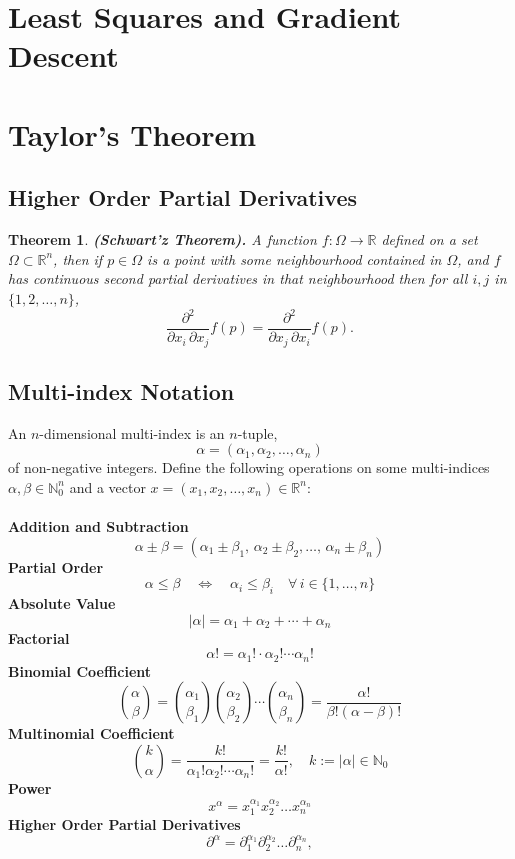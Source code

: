 \documentclass[11pt,a4paper]{article}
\theoremstyle{definition}
\theoremstyle{plain}
\newtheorem{theorem}{Theorem}[section]
\newcommand{\N}{\mathbb{N}}
\newcommand{\R}{\mathbb{R}}
\begin{document}
	\newpage
	
	\section{Least Squares and Gradient Descent}
	
	\newpage
	
	\section{Taylor's Theorem}
	\subsection{Higher Order Partial Derivatives}
	\begin{theorem}
		\textnormal{\textbf{(Schwart'z Theorem).}}
		A function $f \colon \Omega \to \R$ defined
		on a set $\Omega \subset \R^n$, then if $p \in \Omega$ is a point
		with some neighbourhood contained in $\Omega$, and $f$ has continuous
		second partial derivatives in that neighbourhood then for all $i,j$
		in $\{1,2,\dots,n\}$,
		\[
			{\frac {\partial ^{2}}{\partial x_{i}\,
			\partial x_{j}}}f({p})={\frac {\partial ^{2}}{\partial x_{j}\,
			\partial x_{i}}}f({p}).
		\]
	\end{theorem}
	
	\subsection{Multi-index Notation}
	An $n$-dimensional multi-index is an $n$-tuple,
	\[
		\alpha =(\alpha _{1},\alpha _{2},\ldots ,\alpha _{n})
	\]
	of non-negative integers. Define the following operations on some
	multi-indices $\alpha ,\beta \in \N_{0}^{n}$ and a vector
	$x=(x_{1},x_{2},\ldots ,x_{n})\in \mathbb {R} ^{n}$: \\\\
	\textbf{Addition and Subtraction}
	\[
		\alpha \pm \beta =
		(\alpha _{1}\pm \beta _{1},\,\alpha _{2}\pm 
		\beta _{2},\ldots ,\,\alpha _{n}\pm \beta _{n})
	\]
	\textbf{Partial Order}
	\[
		\alpha \leq \beta \quad \Leftrightarrow \quad 
		\alpha _{i}\leq \beta _{i}\quad \forall \,i\in \{1,\ldots ,n\}
	\]
	\textbf{Absolute Value}
	\[
		|\alpha |=\alpha _{1}+\alpha _{2}+\cdots +\alpha _{n}
	\]
	\textbf{Factorial}
	\[
		\alpha !=\alpha _{1}!\cdot \alpha _{2}!\cdots \alpha _{n}!
	\]
	\textbf{Binomial Coefficient}
	\[
		{\binom {\alpha}{\beta}} = 
		{\binom {\alpha_{1}}{\beta_{1}}}
		{\binom {\alpha_{2}}{\beta_{2}}}\cdots 
		{\binom {\alpha_{n}}{\beta_{n}}} = 
		{\frac {\alpha!}{\beta! (\alpha-\beta)!}}
	\]
	\textbf{Multinomial Coefficient}
	\[
		{\binom {k}{\alpha}} = 
		{\frac {k!}{\alpha_{1}!\alpha_{2}! \cdots \alpha_{n}!}} = 
		{\frac {k!}{\alpha!}}, 
		\quad k:=|\alpha |\in \mathbb {N}_{0}
	\]
	\textbf{Power}
	\[
		x^{\alpha} = 
		x_{1}^{\alpha_{1}}x_{2}^{\alpha_{2}}\ldots x_{n}^{\alpha_{n}}
	\]
	\textbf{Higher Order Partial Derivatives}
	\[
		\partial^{\alpha} = 
		\partial_{1}^{\alpha _{1}}
		\partial _{2}^{\alpha _{2}} \ldots 
		\partial _{n}^{\alpha _{n}},
	\]
\end{document}
